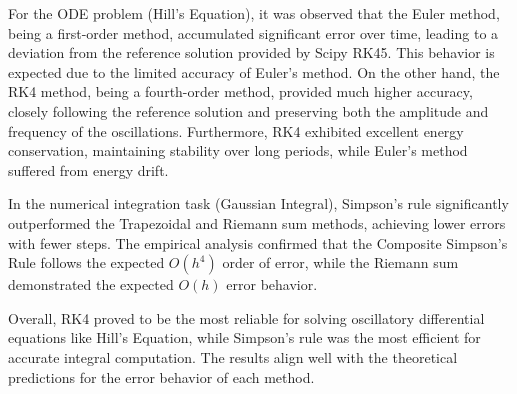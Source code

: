 \documentclass[twocolumn, 11pt]{article}
\begin{document}
For the ODE problem (Hill's Equation), it was observed that the Euler method, being a first-order method, accumulated significant error over time, leading to a deviation from the reference solution provided by Scipy RK45. This behavior is expected due to the limited accuracy of Euler's method. On the other hand, the RK4 method, being a fourth-order method, provided much higher accuracy, closely following the reference solution and preserving both the amplitude and frequency of the oscillations. Furthermore, RK4 exhibited excellent energy conservation, maintaining stability over long periods, while Euler's method suffered from energy drift.

In the numerical integration task (Gaussian Integral), Simpson’s rule significantly outperformed the Trapezoidal and Riemann sum methods, achieving lower errors with fewer steps. The empirical analysis confirmed that the Composite Simpson's Rule follows the expected \(O(h^4)\) order of error, while the Riemann sum demonstrated the expected \(O(h)\) error behavior.

Overall, RK4 proved to be the most reliable for solving oscillatory differential equations like Hill's Equation, while Simpson’s rule was the most efficient for accurate integral computation. The results align well with the theoretical predictions for the error behavior of each method.
\end{document}

